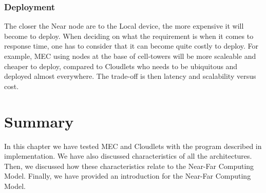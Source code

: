 \subsubsection{Deployment}
The closer the Near node are to the Local device, the more expensive it will become to deploy. When deciding on what the requirement is when it comes to response time, one has to consider that it can become quite costly to deploy. For example, MEC using nodes at the base of cell-towers will be more scaleable and cheaper to deploy, compared to Cloudlets who needs to be ubiquitous and deployed almost everywhere. The trade-off is then latency and scalability versus cost.

\section{Summary}
In this chapter we have tested MEC and Cloudlets with the program described in implementation. We have also discussed characteristics of all the architectures. Then, we discussed how these characteristics relate to the Near-Far Computing Model. Finally, we have provided an introduction for the Near-Far Computing Model.





